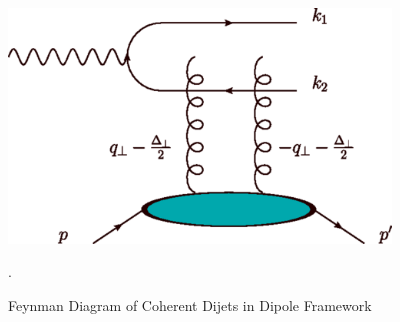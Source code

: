 \begin{figure}[h!]
\begin{centering}
\includegraphics[width=4in]{Chapter1/importfigs/fig4_yatta.png}
\par\end{centering}
\caption{Feynman Diagram of Coherent Dijets in Dipole Framework \cite{Hatta:2016dxp}\label{fig:yatta1}}.
\end{figure}